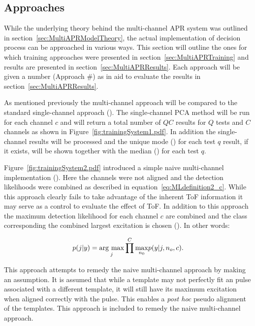 \subsection{Approaches}
While the underlying theory behind the multi-channel APR system was outlined in section~\ref{sec:MultiAPRModelTheory}, the actual implementation of decision process can be approached in various ways. This section will outline the ones for which training approaches were presented in section~\ref{sec:MultiAPRTraining} and results are presented in section~\ref{sec:MultiAPRResults}. Each approach will be given a number (Approach \#) as in aid to evaluate the results in section~\ref{sec:MultiAPRResults}.

As mentioned previously the multi-channel approach will be compared to the standard single-channel approach (). The single-channel PCA method will be run for each channel $c$ and will return a total number of $QC$ results for $Q$ tests and $C$ channels as shown in Figure~\ref{fig:trainingSystem1.pdf}. In addition the single-channel results will be processed and the unique mode () for each test $q$ result, if it exists, will be shown together with the median () for each test $q$.

Figure~\ref{fig:trainingSystem2.pdf} introduced a simple naive multi-channel implementation (). Here the channels were not aligned and the detection likelihoods were combined as described in equation~\ref{eq:MLdefinition2_c}. While this approach clearly fails to take advantage of the inherent ToF information it may serve as a control to evaluate the effect of ToF. In addition to this approach the maximum detection likelihood for each channel $c$ are combined and the class corresponding the combined largest excitation is chosen (). In other words:

\begin{equation}\label{eq:jointprob3_c}
p(j|y) = \underset{j}{\mathrm{arg~max}} \prod^C \underset{n_0}{\max} p(y|j,n_o,c).
\end{equation}

This approach attempts to remedy the naive multi-channel approach by making an assumption. It is assumed that while a template may not perfectly fit an pulse associated with a different template, it will still have its maximum excitation when aligned correctly with the pulse. This enables a \emph{post hoc} pseudo alignment of the templates. This approach is included to remedy the naive multi-channel approach.

